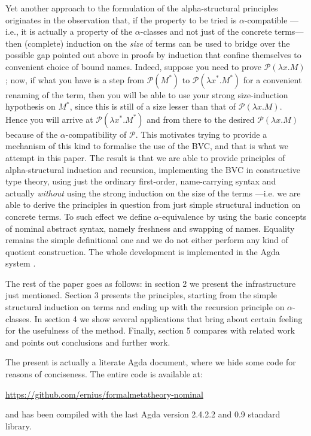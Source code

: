 \documentclass{entcs}
\begin{document}
Yet another approach to the formulation of the alpha-structural principles originates in the observation that, if the property to be tried is $\alpha$-compatible ---i.e., it is actually a property of the $\alpha$-classes and not just of the concrete terms--- then (complete) induction on the \emph{size} of terms can be used to bridge over the possible gap pointed out above in proofs by induction that confine themselves to convenient choice of bound names. 
Indeed, suppose you need to prove $\mathcal{P}(\lambda x.M)$; now, if what you have is a step from $\mathcal{P}(M^{*})$ to $\mathcal{P}(\lambda x^{*}.M^{*})$ for a convenient renaming of the term, then you will be able to use your strong size-induction hypothesis on $M^{*}$, since this is still of a size lesser than that of $\mathcal{P}(\lambda x.M)$. Hence you will arrive at $\mathcal{P}(\lambda x^{*}.M^{*})$ and from there to the desired $\mathcal{P}(\lambda x.M)$ because of the $\alpha$-compatibility of $\mathcal{P}$.
This motivates trying to provide a mechanism of this kind to formalise the use of the BVC, and that is what we attempt in this paper. The result is  that we are able to provide principles of alpha-structural induction and recursion, implementing the BVC in constructive type theory, using just the ordinary first-order, name-carrying syntax and actually \emph{without} using the strong induction on the size of the terms ---i.e. we are able to derive the principles in question from just simple structural induction on concrete terms. To such effect we define $\alpha$-equivalence by using the basic concepts of nominal abstract syntax, namely freshness and swapping of names. Equality remains the simple definitional one and we do not either perform any kind of quotient construction. The whole development is implemented in the Agda system \cite{agda}.

The rest of the paper goes as follows: in section 2 we present the infrastructure just mentioned. Section 3 presents the principles, starting from the simple structural induction on terms and ending up with the recursion principle on $\alpha$-classes. In section 4 we show several applications that bring about certain feeling for the usefulness of the method. Finally, section 5 compares with related work and points out conclusions and further work.

The present is actually a literate Agda document, where we hide some code for reasons of conciseness.  The entire code is available at:
\begin{center}
  \href{https://github.com/ernius/formalmetatheory-nominal}{https://github.com/ernius/formalmetatheory-nominal}
\end{center}
and has been compiled with the last Agda version 2.4.2.2 and 0.9 standard library.
\end{document}
